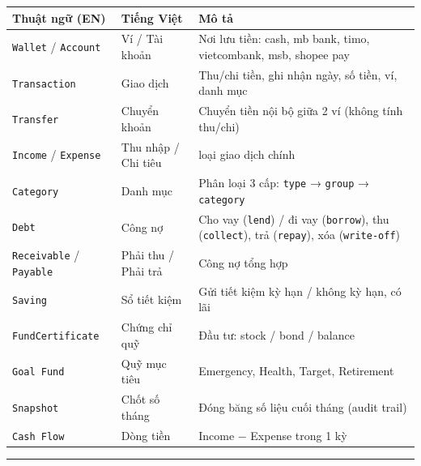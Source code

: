 \documentclass[11pt,a4paper]{article}
\newcounter{none}
\begin{document}
{\def\LTcaptype{none}
\begin{longtable}[]{@{}
  >{\raggedright\arraybackslash}p{}
  >{\raggedright\arraybackslash}p{}
  >{\raggedright\arraybackslash}p{}@{}}
\toprule\noalign{}
\begin{minipage}[b]{\linewidth}\raggedright
Thuật ngữ (EN)
\end{minipage} & \begin{minipage}[b]{\linewidth}\raggedright
Tiếng Việt
\end{minipage} & \begin{minipage}[b]{\linewidth}\raggedright
Mô tả
\end{minipage} \\
\midrule\noalign{}
\endhead
\bottomrule\noalign{}
\endlastfoot
\texttt{Wallet} / \texttt{Account} & Ví / Tài khoản & Nơi lưu tiền: cash, mb bank, timo, vietcombank, msb, shopee pay \\ 
\texttt{Transaction} & Giao dịch & Thu/chi tiền, ghi nhận ngày, số tiền, ví, danh mục \\ 
\texttt{Transfer} & Chuyển khoản & Chuyển tiền nội bộ giữa 2 ví (không tính thu/chi) \\ 
\texttt{Income} / \texttt{Expense} & Thu nhập / Chi tiêu & 2 loại giao dịch chính \\ 
\texttt{Category} & Danh mục & Phân loại 3 cấp: \texttt{type} → \texttt{group} → \texttt{category} \\ 
\texttt{Debt} & Công nợ & Cho vay (\texttt{lend}) / đi vay (\texttt{borrow}), thu (\texttt{collect}), trả (\texttt{repay}), xóa (\texttt{write-off}) \\ 
\texttt{Receivable} / \texttt{Payable} & Phải thu / Phải trả & Công nợ tổng hợp \\ 
\texttt{Saving} & Sổ tiết kiệm & Gửi tiết kiệm kỳ hạn / không kỳ hạn, có lãi \\ 
\texttt{FundCertificate} & Chứng chỉ quỹ & Đầu tư: stock / bond / balance \\ 
\texttt{Goal\ Fund} & Quỹ mục tiêu & Emergency, Health, Target, Retirement \\ 
\texttt{Snapshot} & Chốt số tháng & Đóng băng số liệu cuối tháng (audit trail) \\ 
\texttt{Cash\ Flow} & Dòng tiền & Income − Expense trong 1 kỳ \\
\end{longtable}
}

\begin{center}\rule{1.0\linewidth}{0.5pt}\end{center}
\end{document}
